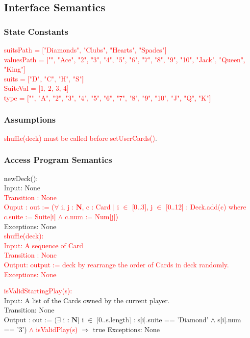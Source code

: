 \documentclass[12pt, titlepage]{article}
\begin{document}
\subsection{Interface Semantics}
\subsubsection{State Constants}
\textcolor{red}{suitsPath = ["Diamonds", "Clubs", "Hearts", "Spades"]}\\
\noindent \textcolor{red}{valuesPath = ["", "Ace", "2", "3", "4", "5", "6", "7", "8", "9", "10", "Jack", "Queen", "King"]}\\
\noindent \textcolor{red}{suits = ["D", "C", "H", "S"]}\\
\noindent \textcolor{red}{SuiteVal = [1, 2, 3, 4]}\\
\noindent \textcolor{red}{type = ["", "A", "2", "3", "4", "5", "6", "7", "8", "9", "10", "J", "Q", "K"]}

\subsubsection{Assumptions}
\textcolor{red}{shuffle(deck) must be called before setUserCards()}.
\subsubsection{Access Program Semantics}

\noindent newDeck():\\
Input: None\\
\textcolor{red}{Transition : None\\
Ouput : out := ($\forall$ i, j : $\mathbf{N}$, c : Card $|$ i $\in$ [0..3], j $\in$ [0..12] : Deck.add(c) where c.suite := Suite[i] $\land$ c.num := Num[j])}\\
Exceptions: None \\

\noindent \textcolor{red}{shuffle(deck):\\
Input: A sequence of Card\\
Transition : None\\
Output: output := deck by rearrange the order of Cards in deck randomly.\\
Exceptions: None\\}

\noindent \textcolor{red}{isValidStartingPlay(s):}\\
Input: A list of the Cards owned by the current player.\\
Transition: None\\
Output : out := ($\exists$ i : $\mathbf{N} |$ i $\in$ [0..s.length] : s[i].suite == 'Diamond' $\land$ s[i].num == '3') \textcolor{red}{ $\land$ isValidPlay(s)} $\Rightarrow$ true
Exceptions: None \\
\end{document}
